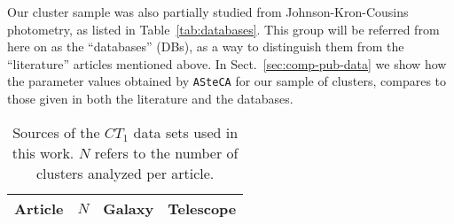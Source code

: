 \documentclass[draft]{aa}
\begin{document}
Our cluster sample was also partially studied from Johnson-Kron-Cousins
photometry, as listed in Table~\ref{tab:databases}.
This group will be referred from here on as the ``databases'' (DBs), as a way to
distinguish them from the ``literature'' articles mentioned above.
%
In Sect.~\ref{sec:comp-pub-data} we show how the parameter values obtained
by \texttt{ASteCA} for our sample of clusters, compares to those given in both the
literature and the databases.

\begin{table} 
\centering
 \caption{Sources of the $CT_1$ data sets used in this work. $N$ refers to the
 number of clusters analyzed per article.}
\label{tab:literature}
 \begin{tabular}{l c c c}
\hline\hline
Article & $N$ & Galaxy & Telescope \\
\hline

\end{tabular}
\end{table}
\end{document}
